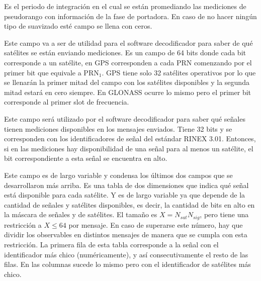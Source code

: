 \documentclass[a4paper,12pt,oneside,onecolumn,final,openright]{book}%
\begin{document}
\begin{description}[wide]
	\item[Intervalo de suavizado] Es el periodo de integración en el cual se están promediando las mediciones de pseudorango con información de la fase de portadora. En caso de no hacer ningún tipo de suavizado esté campo se llena con ceros.
	\item[Máscara de satélites GNSS] Este campo va a ser de utilidad para el software decodificador para saber de qué satélites se están enviando mediciones. Es un campo de 64 bits donde cada bit corresponde a un satélite, en GPS corresponden a cada PRN comenzando por el primer bit que equivale a $\text{PRN}_1$. GPS tiene solo 32 satélites operativos por lo que se llenarán la primer mitad del campo con los satélites disponibles y la segunda mitad estará en cero siempre. En GLONASS ocurre lo mismo pero el primer bit corresponde al primer slot de frecuencia.
	\item[Máscara de señales GNSS] Este campo será utilizado por el software decodificador para saber qué señales tienen mediciones disponibles en los mensajes enviados. Tiene 32 bits y se corresponden con los identificadores de señal del estándar RINEX 3.01. Entonces, si en las mediciones hay disponibilidad de una señal para al menos un satélite, el bit correspondiente a esta señal se encuentra en alto.
	\item[Máscara de celdas GNSS] Este campo es de largo variable y condensa los últimos dos campos que se desarrollaron más arriba. Es una tabla de dos dimensiones que indica qué señal está disponible para cada satélite. Y es de largo variable ya que depende de la cantidad de señales y satélites disponibles, es decir, la cantidad de bits en alto en la máscara de señales y de satélites. El tamaño es $X = N_{sat}N_{sig}$, pero tiene una restricción a $X\leq 64$ por mensaje. En caso de superarse este número, hay que dividir los observables en distintos mensajes de manera que se cumpla con esta restricción. La primera fila de esta tabla corresponde a la señal con el identificador más chico (numéricamente), y así consecutivamente el resto de las filas. En las columnas sucede lo mismo pero con el identificador de satélites más chico.
\end{description}
	
\end{document}
